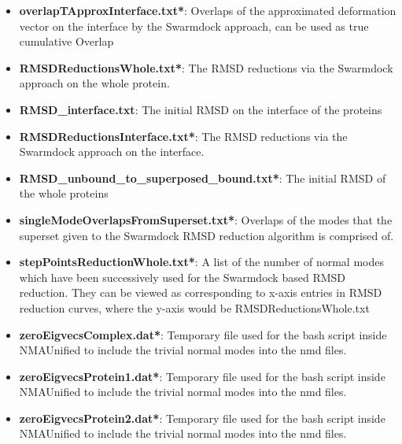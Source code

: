 \documentclass[11pt]{article}
\begin{document}
\begin{itemize}
 \item \textbf{overlapTApproxInterface.txt*}: Overlaps of the approximated deformation vector on the interface by the Swarmdock approach, can be used as true cumulative Overlap
 \item \textbf{RMSDReductionsWhole.txt*}: The RMSD reductions via the Swarmdock approach on the whole protein.
 \item \textbf{RMSD\_interface.txt}: The initial RMSD on the interface of the proteins
 \item \textbf{RMSDReductionsInterface.txt*}: The RMSD reductions via the Swarmdock approach on the interface.
 \item \textbf{RMSD\_unbound\_to\_superposed\_bound.txt*}: The initial RMSD of the whole proteins
 \item \textbf{singleModeOverlapsFromSuperset.txt*}: Overlaps of the modes that the superset given to the Swarmdock RMSD reduction algorithm is comprised of. 
 \item \textbf{stepPointsReductionWhole.txt*}: A list of the number of normal modes which have been successively used for the Swarmdock based RMSD reduction. They can be viewed as corresponding to x-axis entries in RMSD reduction curves, where the y-axis would be RMSDReductionsWhole.txt
 \item \textbf{zeroEigvecsComplex.dat*}: Temporary file used for the bash script inside NMAUnified to include the trivial normal modes into the nmd files.
  \item \textbf{zeroEigvecsProtein1.dat*}: Temporary file used for the bash script inside NMAUnified to include the trivial normal modes into the nmd files.
 \item \textbf{zeroEigvecsProtein2.dat*}: Temporary file used for the bash script inside NMAUnified to include the trivial normal modes into the nmd files.


\end{itemize}

\end{document}
